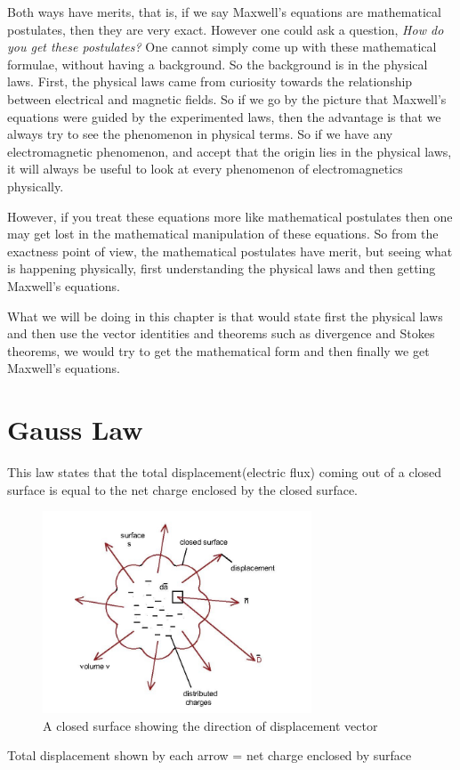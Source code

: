 Both ways have merits, that is, if we say Maxwell's equations are mathematical postulates, then they are very exact. However one could ask a question, \emph{How do you get these postulates?} One cannot simply come up with these mathematical formulae, without having a background. So the background is in the physical laws. First, the physical laws came from curiosity towards the relationship between electrical and magnetic fields. So if we go by the picture that Maxwell's equations were guided by the experimented laws, then the advantage is that we always try to see the phenomenon in physical terms. So if we have any electromagnetic phenomenon, and accept that the origin lies in the physical laws, it will always be useful to look at every phenomenon of electromagnetics physically.

However, if you treat these equations more like mathematical postulates then one may get lost in the mathematical manipulation of these equations. So from the exactness point of view, the mathematical postulates have merit, but seeing what is happening physically, first understanding the physical laws and then getting Maxwell's equations.

What we will be doing in this chapter is that would state first the physical laws and then use the vector identities and theorems such as divergence and Stokes theorems, we would try to get the mathematical form and then finally we get Maxwell's equations.

\section{Gauss Law}
This law states that the total displacement(electric flux) coming out of a closed surface is equal to the net charge enclosed by the closed surface.

\begin{figure}[h]
	\centering
	\includegraphics[height=6cm]{graphics/g}
	\caption{A closed surface showing the direction of displacement vector}
	\label{fig:g}
\end{figure}
Total displacement shown by each arrow = net charge enclosed by surface

